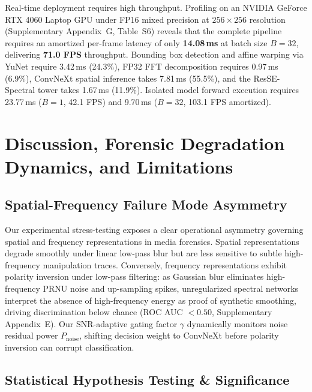 \documentclass[10pt,twocolumn,letterpaper]{article}
\begin{document}
Real-time deployment requires high throughput. Profiling on an NVIDIA GeForce RTX 4060 Laptop GPU under FP16 mixed precision at $256 \times 256$ resolution (Supplementary Appendix~G, Table~S6) reveals that the complete pipeline requires an amortized per-frame latency of only \textbf{14.08\,ms} at batch size $B = 32$, delivering \textbf{71.0 FPS} throughput. Bounding box detection and affine warping via YuNet require 3.42\,ms (24.3\%), FP32 FFT decomposition requires 0.97\,ms (6.9\%), ConvNeXt spatial inference takes 7.81\,ms (55.5\%), and the ResSE-Spectral tower takes 1.67\,ms (11.9\%). Isolated model forward execution requires 23.77\,ms ($B = 1$, 42.1 FPS) and 9.70\,ms ($B = 32$, 103.1 FPS amortized).

\section{Discussion, Forensic Degradation Dynamics, and Limitations}
\label{sec:discussion}

\subsection{Spatial-Frequency Failure Mode Asymmetry}
\label{sec:disc_asymmetry}

Our experimental stress-testing exposes a clear operational asymmetry governing spatial and frequency representations in media forensics. Spatial representations degrade smoothly under linear low-pass blur but are less sensitive to subtle high-frequency manipulation traces. Conversely, frequency representations exhibit polarity inversion under low-pass filtering: as Gaussian blur eliminates high-frequency PRNU noise and up-sampling spikes, unregularized spectral networks interpret the absence of high-frequency energy as proof of synthetic smoothing, driving discrimination below chance (ROC AUC $<0.50$, Supplementary Appendix~E). Our SNR-adaptive gating factor $\gamma$ dynamically monitors noise residual power $P_{\mathrm{noise}}$, shifting decision weight to ConvNeXt before polarity inversion can corrupt classification.

\subsection{Statistical Hypothesis Testing \& Significance}
\label{sec:disc_significance}
\end{document}
